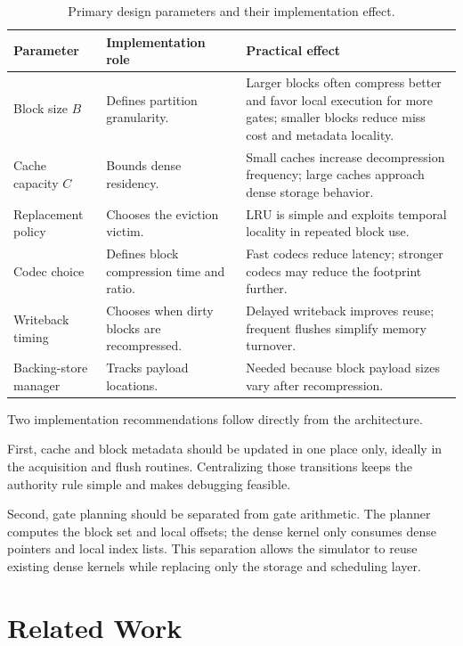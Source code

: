 \documentclass[runningheads]{llncs}
\begin{document}
\begin{table}
\centering
\small
\caption{Primary design parameters and their implementation effect.}
\label{tab:design-parameters}
\begin{tabular}{>{\raggedright\arraybackslash}p{}
                >{\raggedright\arraybackslash}p{}
                >{\raggedright\arraybackslash}p{}}
\toprule
\textbf{Parameter} & \textbf{Implementation role} & \textbf{Practical effect} \\
\midrule
Block size $B$ & Defines partition granularity. & Larger blocks often compress better and favor local execution for more gates; smaller blocks reduce miss cost and metadata locality. \\
Cache capacity $C$ & Bounds dense residency. & Small caches increase decompression frequency; large caches approach dense storage behavior. \\
Replacement policy & Chooses the eviction victim. & LRU is simple and exploits temporal locality in repeated block use. \\
Codec choice & Defines block compression time and ratio. & Fast codecs reduce latency; stronger codecs may reduce the footprint further. \\
Writeback timing & Chooses when dirty blocks are recompressed. & Delayed writeback improves reuse; frequent flushes simplify memory turnover. \\
Backing-store manager & Tracks payload locations. & Needed because block payload sizes vary after recompression. \\
\bottomrule
\end{tabular}
\end{table}

Two implementation recommendations follow directly from the architecture.

First, cache and block metadata should be updated in one place only, ideally in the acquisition and flush routines. Centralizing those transitions keeps the authority rule simple and makes debugging feasible.

Second, gate planning should be separated from gate arithmetic. The planner computes the block set and local offsets; the dense kernel only consumes dense pointers and local index lists. This separation allows the simulator to reuse existing dense kernels while replacing only the storage and scheduling layer.

\section{Related Work}
\end{document}
